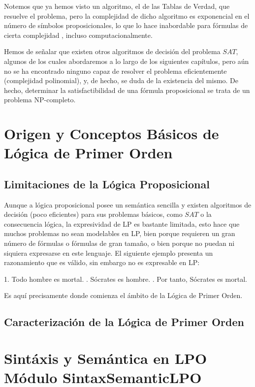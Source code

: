 \documentclass[a4paper]{report}
\begin{document}
Notemos que ya hemos visto un algoritmo, el de las Tablas de Verdad, que resuelve el problema, pero la complejidad de dicho algoritmo es exponencial en el número de símbolos proposicionales, lo que lo hace inabordable para fórmulas de cierta complejidad , incluso computacionalmente.

Hemos de señalar que existen otros algoritmos de decisión del problema $SAT$, algunos de los cuales abordaremos a lo largo de los siguientes capítulos, pero aún no se ha encontrado ninguno capaz de resolver el problema eficientemente (complejidad polinomial), y, de hecho, se duda de la existencia del mismo. De hecho, determinar la satisfactibilidad de una fórmula proposicional se trata de un problema NP-completo.

\section{Origen y Conceptos Básicos de Lógica de Primer Orden}

\subsection{Limitaciones de la Lógica Proposicional}

Aunque a lógica proposicional posee un semántica sencilla y existen algoritmos de decisión (poco eficientes) para sus problemas básicos, como $SAT$ o la consecuencia lógica, la expresividad de LP es bastante limitada, esto hace que muchos problemas no sean modelables en LP, bien porque requieren un gran número de fórmulas o fórmulas de gran tamaño, o bien porque no puedan ni siquiera expresarse en este lenguaje. 
\newpage
El siguiente ejemplo presenta un razonamiento que es válido, sin embargo no es expresable en LP:
\begin{center}
1. Todo hombre es mortal. . Sócrates es hombre. . Por tanto, Sócrates es mortal.
\end{center}

Es aquí precisamente donde comienza el ámbito de la Lógica de Primer Orden.

\subsection{Caracterización de la Lógica de Primer Orden}

\toDo

\section{Sintáxis y Semántica en LPO Módulo SintaxSemanticLPO}
\toDo
\end{document}
